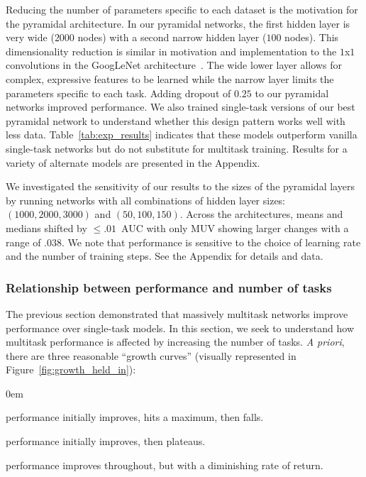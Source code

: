 Reducing the number of parameters specific to each dataset is the
motivation for the pyramidal architecture. In our pyramidal networks, the
first hidden layer is very wide ($2000$ nodes) with a second narrow hidden
layer ($100$ nodes). This dimensionality reduction is similar in motivation
and implementation to the $1$x$1$ convolutions in the GoogLeNet
architecture~\cite{szegedy2014going}. The wide lower layer allows for
complex, expressive features to be learned while the narrow layer limits
the parameters specific to each task. Adding dropout of $0.25$ to our
pyramidal networks improved performance. We also trained single-task
versions of our best pyramidal network to understand whether this design
pattern works well with less data. Table~\ref{tab:exp_results} indicates
that these models outperform vanilla single-task networks but do not
substitute for multitask training.  Results for a variety of alternate
models are presented in the Appendix.

We investigated the sensitivity of our results to the sizes of the
pyramidal layers by running networks with all combinations of hidden layer
sizes: $(1000, 2000, 3000)$ and $(50, 100, 150)$.  Across the
architectures, means and medians shifted by $\le.01$~AUC with only MUV
showing larger changes with a range of $.038$.  We note that performance is
sensitive to the choice of learning rate and the number of training steps.
See the Appendix for details and data.

\subsubsection{Relationship between performance and number of tasks}
\label{sec:growth_curve}

The previous section demonstrated that massively multitask networks improve
performance over single-task models. In this section, we seek to understand
how multitask performance is affected by increasing the number of tasks.
\emph{A priori}, there are three reasonable ``growth curves'' (visually
represented in Figure~\ref{fig:growth_held_in}):
\begin{description}
\itemsep0em
\item[Over the hill:] performance initially improves, hits a maximum, then falls.
\item[Plateau:] performance initially improves, then plateaus.
\item[Still climbing:] performance improves throughout, but with a diminishing rate of
return.
\end{description}

